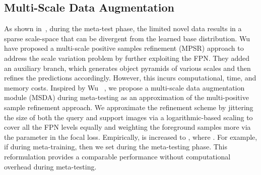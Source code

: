 \documentclass[10pt,twocolumn,letterpaper]{article}
\begin{document}
\subsection{Multi-Scale Data Augmentation}

As shown in~\cite{MPSR}, during the meta-test phase, the limited novel data results in a sparse scale-space that can be divergent from the learned base distribution. Wu \etal~\cite{MPSR} have proposed a multi-scale positive samples refinement (MPSR) approach to address the scale variation problem by further exploiting the FPN. They added an auxiliary branch, which generates object pyramids of various scales and then refines the predictions accordingly. However, this incurs computational, time, and memory costs. Inspired by Wu \etal~\cite{MPSR}, we propose a multi-scale data augmentation module (MSDA) during meta-testing as an approximation of the multi-positive sample refinement approach. We approximate the refinement scheme by jittering the size of both the query and support images via a logarithmic-based scaling to cover all the FPN levels equally and weighting the foreground samples more via the  parameter in the focal loss. Empirically,  is increased to , where . For example, if  during meta-training, then we set  during the meta-testing phase. This reformulation provides a comparable performance without computational overhead during meta-testing.  
\end{document}

